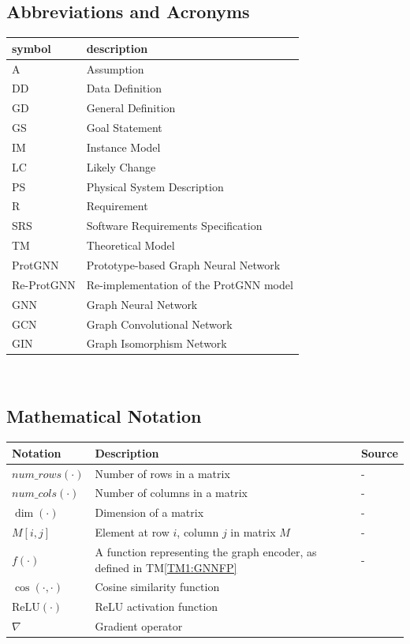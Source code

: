 \documentclass[12pt]{article}
\newcommand{\tref}[1]{TM\ref{#1}}
\begin{document}
\subsection{Abbreviations and Acronyms}

\renewcommand{\arraystretch}{1.2}
\begin{tabular}{l l} 
  \toprule		
  \textbf{symbol} & \textbf{description}\\
  \midrule 
  A & Assumption\\
  DD & Data Definition\\
  GD & General Definition\\
  GS & Goal Statement\\
  IM & Instance Model\\
  LC & Likely Change\\
  PS & Physical System Description\\
  R & Requirement\\
  SRS & Software Requirements Specification\\
  TM & Theoretical Model\\
  ProtGNN & Prototype-based Graph Neural Network\\
  Re-ProtGNN & Re-implementation of the ProtGNN model\\
  GNN & Graph Neural Network\\
  GCN & Graph Convolutional Network\\
  GIN & Graph Isomorphism Network\\
  \bottomrule
\end{tabular}\\


\subsection{Mathematical Notation}

\renewcommand{\arraystretch}{1.2}
\noindent \begin{longtable*}{l p{7cm} l} 
\toprule
\textbf{Notation} & \textbf{Description} & \textbf{Source} \\
\midrule 
$num\_rows(\cdot)$ & Number of rows in a matrix & - \\
$num\_cols(\cdot)$ & Number of columns in a matrix & -\\
$\dim(\cdot)$ & Dimension of a matrix & - \\
$M[i, j]$ & Element at row $i$, column $j$ in matrix $M$ & - \\
$f(\cdot)$ & A function representing the graph encoder, as defined in \tref{TM1:GNNFP} & - \\
$\cos(\cdot, \cdot)$ & Cosine similarity function & ~\cite{sciencedirect_cosine_similarity} \\
$\text{ReLU}(\cdot)$ & ReLU activation function & ~\cite{wikipedia_relu} \\
$\nabla$ & Gradient operator & ~\cite{wikipedia_gradient} \\
\bottomrule
\end{longtable*}
\end{document}
